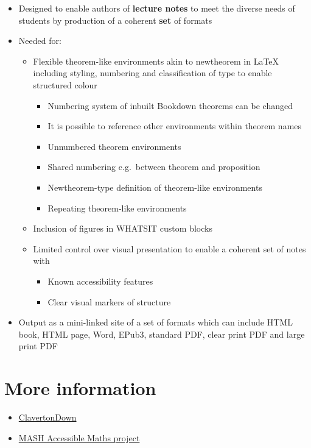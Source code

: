\documentclass[
  10pt,
  a4paper]{article}
\providecommand{\tightlist}{%
  \setlength{\itemsep}{0pt}\setlength{\parskip}{0pt}}
\begin{document}
\begin{itemize}
\tightlist
\item
  Designed to enable authors of \textbf{lecture notes} to meet the diverse needs of students by production of a coherent \textbf{set} of formats
\item
  Needed for:

  \begin{itemize}
  \tightlist
  \item
    Flexible theorem-like environments akin to newtheorem in LaTeX including styling, numbering and classification of type to enable structured colour

    \begin{itemize}
    \tightlist
    \item
      Numbering system of inbuilt Bookdown theorems can be changed
    \item
      It is possible to reference other environments within theorem names
    \item
      Unnumbered theorem environments
    \item
      Shared numbering e.g.~between theorem and proposition
    \item
      Newtheorem-type definition of theorem-like environments
    \item
      Repeating theorem-like environments
    \end{itemize}
  \item
    Inclusion of figures in WHATSIT custom blocks
  \item
    Limited control over visual presentation to enable a coherent set of notes with

    \begin{itemize}
    \tightlist
    \item
      Known accessibility features
    \item
      Clear visual markers of structure
    \end{itemize}
  \end{itemize}
\item
  Output as a mini-linked site of a set of formats which can include HTML book, HTML page, Word, EPub3, standard PDF, clear print PDF and large print PDF
\end{itemize}

\hypertarget{more-information}{%
\section{More information}\label{more-information}}

\begin{itemize}
\tightlist
\item
  \href{https://bathmash.github.io/clavertondown/}{ClavertonDown}
\item
  \href{https://www.bath.ac.uk/projects/mathematics-accessibility/}{MASH Accessible Maths project}
\end{itemize}
\end{document}

